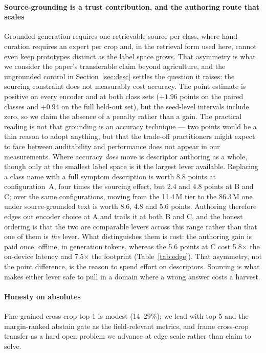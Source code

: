 \documentclass[a4paper,fleqn]{cas-dc}
\begin{document}
\paragraph{Source-grounding is a trust contribution, and the authoring route that scales} Grounded
generation requires one retrievable source per class, where hand-curation requires an expert per crop
and, in the retrieval form used here, cannot even keep prototypes distinct as the label space grows.
That asymmetry is what we consider the paper's transferable claim beyond agriculture, and the
ungrounded control in Section~\ref{sec:desc} settles the question it raises: the sourcing constraint
does not measurably cost accuracy. The point estimate is positive on every encoder and at both class
sets ($+1.96$ points on the paired classes and $+0.94$ on the full held-out set), but the
seed-level intervals include zero, so we claim the absence of a penalty rather than a gain. The practical reading is not that grounding is an accuracy technique --- two
points would be a thin reason to adopt anything, but that the trade-off practitioners might expect
to face between auditability and performance does not appear in our measurements. Where accuracy \emph{does} move is descriptor authoring as a whole, though only at the smallest label space is it the largest lever available. Replacing a class name with a full symptom description is worth 8.8 points at configuration~A, four times the sourcing effect, but 2.4 and 4.8 points at B and C; over the same configurations, moving from the 11.4\,M tier to the 86.3\,M one under source-grounded text is worth 8.6, 4.8 and 5.6 points. Authoring therefore edges out encoder choice at A and trails it at both B and C, and the honest ordering is that the two are comparable levers across this range rather than that one of them is \emph{the} lever. What distinguishes them is cost: the authoring gain is paid once, offline, in generation tokens, whereas the 5.6 points at C cost 5.8$\times$ the on-device latency and 7.5$\times$ the footprint (Table~\ref{tab:edge}). That asymmetry, not the point difference, is the reason to spend effort on descriptors. Sourcing is what makes either lever safe to pull in a domain where a wrong answer costs a harvest.

\paragraph{Honesty on absolutes} Fine-grained cross-crop top-1 is modest (14--29\%); we lead with top-5
and the margin-ranked abstain gate as the field-relevant metrics, and frame cross-crop transfer as a hard
open problem we advance at edge scale rather than claim to solve.
\end{document}
